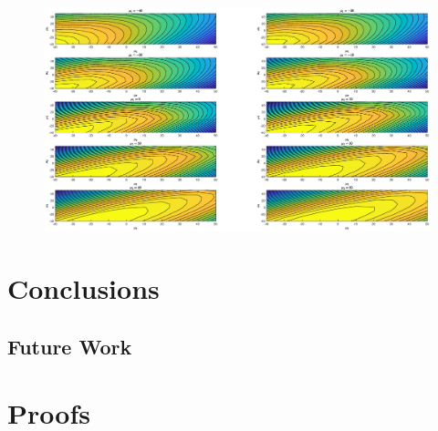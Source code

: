 \documentclass{mpaper}
\begin{document}
\begin{figure}
  \centering
  \includegraphics[width=\textwidth]{elbo_contour_plots}
\end{figure}

\section{Conclusions}

\subsection{Future Work}




\appendix
\section{Proofs}
\end{document}
